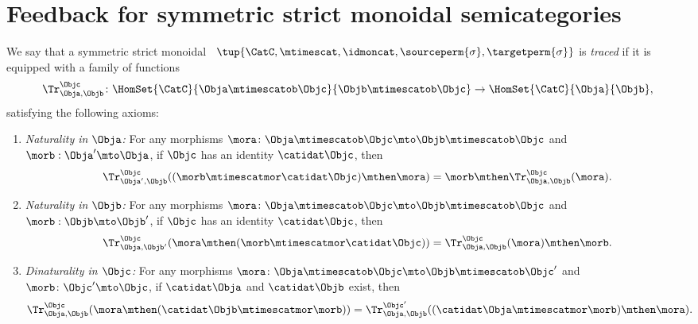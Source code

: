 
\section{Feedback for symmetric strict monoidal semicategories}
\begin{widepar}
    \begin{ctdefinition}
        \label{def:traced-fun-stack-scat}
        We say that a symmetric strict monoidal ~$\tup{\CatC, {{\mtimescat}}, \idmoncat, \sourceperm{\sigma}, \targetperm{\sigma} }$ is \emph{traced} if it is equipped with a family of functions
        \begin{equation}
            \Tr_{\Obja,\Objb}^\Objc\colon \HomSet{\CatC}{\Obja \mtimescatob \Objc}{\Objb\mtimescatob \Objc}\to \HomSet{\CatC}{\Obja}{\Objb},
        \end{equation}
        satisfying the following axioms:
        \begin{enumerate}

            \item \emph{Naturality in $\Obja$:} For any morphisms $\mora\colon \Obja\mtimescatob \Objc \mto \Objb\mtimescatob \Objc$ and $\morb : \Obja' \mto \Obja$, if $\Objc$ has an identity $\catidat\Objc$, then
                  \begin{equation}
                      \Tr_{\Obja', \Objb}^\Objc ( (\morb \mtimescatmor \catidat\Objc) \mthen \mora) = \morb \mthen \Tr_{\Obja, \Objb}^\Objc (\mora).
                  \end{equation}

            \item \emph{Naturality in $\Objb$:}
                  For any morphisms $\mora\colon \Obja\mtimescatob \Objc \mto \Objb\mtimescatob \Objc$ and $\morb : \Objb \mto \Objb'$, if $\Objc$ has an identity $\catidat\Objc$, then
                  \begin{equation}
                      \Tr_{\Obja, \Objb'}^\Objc ( \mora \mthen (\morb \mtimescatmor \catidat\Objc) ) =  \Tr_{\Obja, \Objb}^\Objc (\mora) \mthen \morb.
                  \end{equation}

            \item \emph{Dinaturality in $\Objc$:}
                  For any morphisms $\mora \colon \Obja \mtimescatob \Objc \mto \Objb \mtimescatob \Objc'$ and $\morb \colon \Objc' \mto \Objc$, if $\catidat\Obja$ and $\catidat\Objb$ exist, then
                  \begin{equation}
                      \Tr_{\Obja, \Objb}^{\Objc} (\mora \mthen (\catidat\Objb \mtimescatmor \morb)) = \Tr_{\Obja, \Objb}^{\Objc'}((\catidat\Obja \mtimescatmor \morb) \mthen \mora).
                  \end{equation}


\end{enumerate}
\end{ctdefinition}
\end{widepar}
